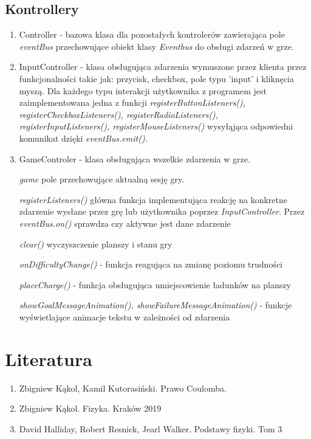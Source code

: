 \documentclass{article}
\begin{document}
\subsection{Kontrollery}
\begin{enumerate}
    \item Controller - bazowa klasa dla pozostałych kontrolerów zawierająca pole \emph{eventBus} przechowujące obiekt klasy \emph{Eventbus} do obsługi zdarzeń w grze.
    
    \item InputController - klasa obsługująca zdarzenia wymuszone przez klienta przez funkcjonalności takie jak: przycisk, checkbox, pole typu 'input' i kliknęcia myszą. Dla każdego typu interakcji użytkownika z programem jest zaimplementowana jedna z funkcji \textit{registerButtonListeners(), registerCheckboxListeners(), registerRadioListeners(), registerInputListeners(), registerMouseListeners()} wysyłąjąca odpowiedni komunikat dzięki \emph{eventBus.emit()}.
    \item GameControler - klasa obsługująca wszelkie zdarzenia w grze.
    
    \emph{game} pole przechowujące aktualną sesję gry.
    
    \emph{registerListeners()} główna funkcja implementująca reakcję na konkretne zdarzenie wysłane przez grę lub użytkownika poprzez \emph{InputController}. Przez \emph{eventBus.on()} sprawdza czy aktywne jest dane zdarzenie
    
    \emph{clear()} wyczyszczenie planszy i stanu gry
    
    \emph{onDifficultyChange()} - funkcja reagująca na zmianę poziomu trudności
    
    \emph{placeCharge()} - funkcja obsługująca umiejscowienie ładunków na planszy
    
    \emph{showGoalMessageAnimation(), showFailureMessageAnimation()} - funkcje wyświetlające animacje tekstu w zależności od zdarzenia
    \end{enumerate}



\section{Literatura}
\begin{enumerate}
    \item Zbigniew Kąkol, Kamil Kutorasiński. Prawo Coulomba. 
    \item Zbigniew Kąkol. Fizyka. Kraków 2019
    \item David Halliday, Robert Resnick, Jearl Walker. Podstawy fizyki. Tom 3
\end{enumerate}
\end{document}
